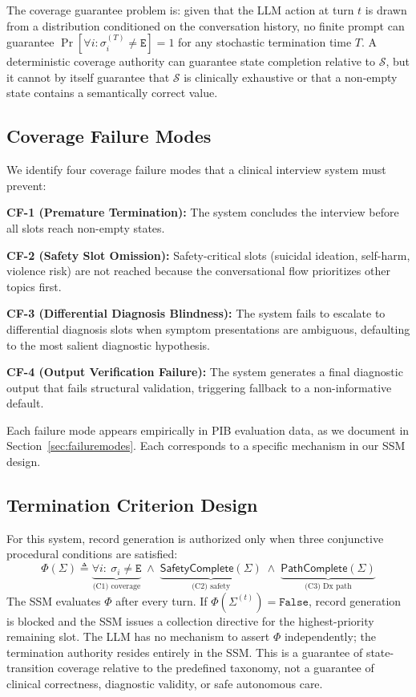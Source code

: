 \documentclass[conference]{IEEEtran}
\begin{document}
The coverage guarantee problem is: given that the LLM action at turn $t$ is drawn from a distribution conditioned on the conversation history, no finite prompt can guarantee $\Pr[\forall i: \sigma_i^{(T)} \neq \texttt{E}] = 1$ for any stochastic termination time $T$. A deterministic coverage authority can guarantee state completion relative to $\mathcal{S}$, but it cannot by itself guarantee that $\mathcal{S}$ is clinically exhaustive or that a non-empty state contains a semantically correct value.

\subsection{Coverage Failure Modes}

We identify four coverage failure modes that a clinical interview system must prevent:

\textbf{CF-1 (Premature Termination):} The system concludes the interview before all slots reach non-empty states.

\textbf{CF-2 (Safety Slot Omission):} Safety-critical slots (suicidal ideation, self-harm, violence risk) are not reached because the conversational flow prioritizes other topics first.

\textbf{CF-3 (Differential Diagnosis Blindness):} The system fails to escalate to differential diagnosis slots when symptom presentations are ambiguous, defaulting to the most salient diagnostic hypothesis.

\textbf{CF-4 (Output Verification Failure):} The system generates a final diagnostic output that fails structural validation, triggering fallback to a non-informative default.

Each failure mode appears empirically in PIB evaluation data, as we document in Section~\ref{sec:failuremodes}. Each corresponds to a specific mechanism in our SSM design.

\subsection{Termination Criterion Design}

For this system, record generation is authorized only when three conjunctive procedural conditions are satisfied:
{\small\[
\Phi(\Sigma) \triangleq \underbrace{\forall i:\ \sigma_i \neq \texttt{E}}_{\text{(C1) coverage}} \;\wedge\; \underbrace{\mathsf{SafetyComplete}(\Sigma)}_{\text{(C2) safety}} \;\wedge\; \underbrace{\mathsf{PathComplete}(\Sigma)}_{\text{(C3) Dx path}}
\]}
The SSM evaluates $\Phi$ after every turn. If $\Phi(\Sigma^{(t)}) = \texttt{False}$, record generation is blocked and the SSM issues a collection directive for the highest-priority remaining slot. The LLM has no mechanism to assert $\Phi$ independently; the termination authority resides entirely in the SSM. This is a guarantee of state-transition coverage relative to the predefined taxonomy, not a guarantee of clinical correctness, diagnostic validity, or safe autonomous care.
\end{document}
